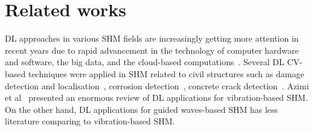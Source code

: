 \section{Related works}
\label{related_works}
DL approaches in various SHM fields are increasingly getting more attention in recent years due to rapid advancement in the technology of computer hardware and software, the big data, and the cloud-based computations~\cite{Azimi}.
Several DL CV-based techniques were applied in SHM related to civil structures such as damage detection and localisation~\cite{Cha2018, Kong2018}, corrosion detection~\cite{Atha2018}, concrete crack detection~\cite{Dung2019}.
Azimi et al~\cite{Azimi} presented an enormous review of DL applications for vibration-based SHM.
On the other hand, DL applications for guided waves-based SHM has less literature comparing to vibration-based SHM.

